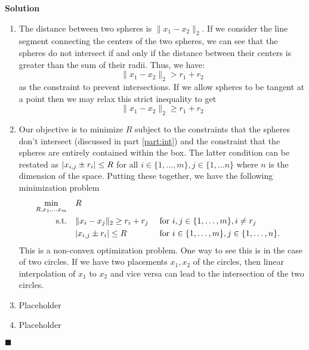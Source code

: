 \documentclass[11pt]{article}
\DeclarePairedDelimiter\abs{\lvert}{\rvert}
\newcommand{\norm}[2]{\lVert #1 \rVert_{#2}}
\theoremstyle{problemstyle}
\newenvironment{solution}
  {\noindent\textbf{Solution}\quad}
  {\hfill$\blacksquare$\par\vspace{1em}}
\begin{document}
\begin{solution}
  \begin{enumerate}
    \item\label{part:int} The distance between two spheres is $\norm{x_1 - x_2}{2}$. If we consider the line segment
      connecting the centers of the two spheres, we can see that the spheres do not intersect if and only if the
      distance between their centers is greater than the sum of their radii. Thus, we have:
      \[
        \norm{x_1 - x_2}{2} > r_1 + r_2
      \]
      as the constraint to prevent intersections. If we allow spheres to be tangent at a point then we may relax this
      strict inequality to get
      \[
        \norm{x_1 - x_2}{2} \geq r_1 + r_2
      \]
    \item Our objective is to minimize $R$ subject to the constraints that the spheres don't intersect (discussed in
      part \ref{part:int}) and the constraint that the spheres are entirely contained within the box. The latter condition
      can be restated as $\abs{x_{i, j} \pm r_i} \leq R$ for all $i \in \{1,\dots,m\}, j \in \{1,\dots n\}$ where $n$ is
      the dimension of the space. Putting these together, we have the following minimization problem
      \begin{equation}
        \begin{aligned}
          \min_{R, x_1, \dots x_m} \quad & R \\
          \textrm{s.t.} \quad &  \norm{x_i - x_j}{2} \geq r_i + r_j && \text{ for } i,j \in \{1,\dots,m\}, i \neq r_j \\
                              & \abs{x_{i,j} \pm r_i} \leq R && \text{ for } i \in \{1,\dots,m\}, j \in \{1,\dots,n\}.
        \end{aligned}
      \end{equation}
      This is a non-convex optimization problem. One way to see this is in the case of two circles. If we have two
      placements $x_1, x_2$ of the circles, then linear interpolation of $x_1$ to $x_2$ and vice versa can lead to the
      intersection of the two circles.
    \item Placeholder
    \item Placeholder
  \end{enumerate}
\end{solution}
\end{document}
